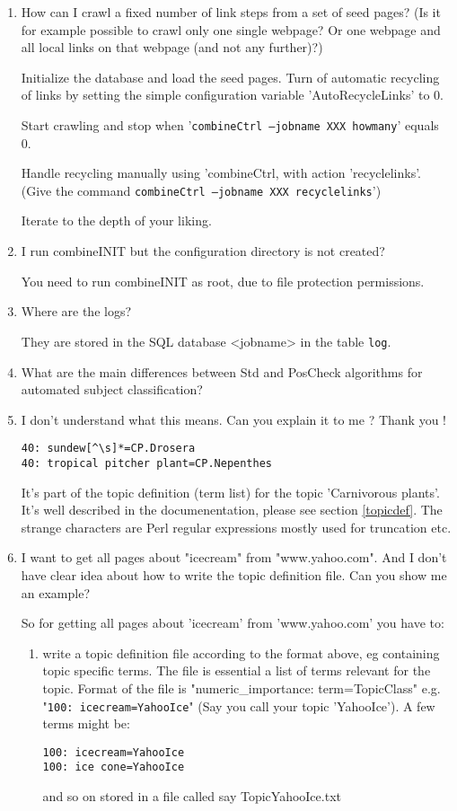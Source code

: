 \begin{enumerate}
\item How can I crawl a fixed number of link steps from a set of seed
pages?
(Is it for example possible to crawl only one single webpage?
Or one webpage and all local links on that webpage (and not
any further)?)

Initialize the database and load the seed pages. Turn of automatic
recycling of links  by setting the simple configuration variable
'AutoRecycleLinks' to 0.


Start crawling and stop when '{\tt combineCtrl --jobname XXX howmany}'
equals 0.

Handle recycling manually using 'combineCtrl, with action 'recyclelinks'.
(Give the command {\tt combineCtrl --jobname XXX recyclelinks}')

Iterate to the depth of your liking.

\item I run combineINIT but the configuration directory is not
created?

You need to run combineINIT as root, due to file protection
permissions.

\item Where are the logs?

They are stored in the SQL database <jobname> in the table {\tt log}.

\item What are the main differences between Std and PosCheck algorithms for automated subject classification?


\item I don't understand what this means. Can you explain it to me ? Thank you !

\begin{verbatim}
40: sundew[^\s]*=CP.Drosera
40: tropical pitcher plant=CP.Nepenthes
\end{verbatim}

It's part of the topic definition (term list) for the topic 'Carnivorous plants'.
It's well described in the documenentation, please see
section \ref{topicdef}.
The strange characters are Perl regular expressions mostly used for truncation etc.

\item
I want to get all pages about "icecream" from "www.yahoo.com". And I don't have clear idea about how to write the topic
definition file. Can you show me an example?

So for getting all pages about 'icecream' from 'www.yahoo.com' you have to:
\begin{enumerate}
\item write a topic definition file according to the format above, eg containing topic specific
   terms. The file is essential a list of terms relevant for the topic. Format of the file is
   "numeric\_importance: term=TopicClass" e.g. "{\tt 100: icecream=YahooIce}"
   (Say you call your topic 'YahooIce'). A few terms might be:\\
\begin{verbatim}
100: icecream=YahooIce
100: ice cone=YahooIce
\end{verbatim}
  and so on stored in a file called say TopicYahooIce.txt


\end{enumerate}
\end{enumerate}
